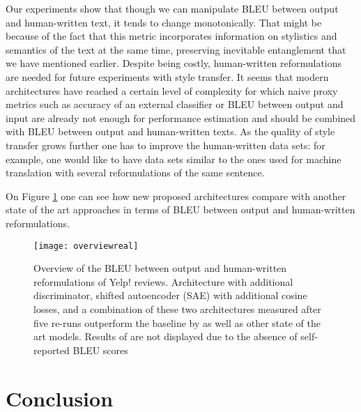 \documentclass[11pt,a4paper]{article}
\begin{document}
Our experiments show that though we can manipulate BLEU between output and human-written text, it tends to change monotonically. That might be because of the fact that this metric incorporates information on stylistics and semantics of the text at the same time, preserving inevitable entanglement that we have mentioned earlier. Despite being costly, human-written reformulations are needed for future experiments with style transfer. It seems that modern architectures have reached a certain level of complexity for which naive proxy metrics such as accuracy of an external classifier or BLEU between output and input are already not enough for performance estimation and should be combined with BLEU between output and human-written texts. As the quality of style transfer grows further one has to improve the human-written data sets: for example, one would like to have data sets similar to the ones used for machine translation with several reformulations of the same sentence. 

On Figure \ref{pic:ovreal} one can see how new proposed architectures compare with another state of the art approaches in terms of BLEU between output and human-written reformulations.

\begin{figure}[ht]
\begin{center}
\centerline{\texttt{[image: overviewreal]}}
\caption{Overview of the BLEU between output and human-written reformulations of Yelp! reviews. Architecture with additional discriminator, shifted autoencoder (SAE) with additional cosine losses, and a combination of these two architectures measured after five re-runs outperform the baseline by \cite{hylsx} as well as other state of the art models. Results of \cite{romanov18} are not displayed due to the absence of self-reported BLEU scores}
\label{pic:ovreal}
\end{center}
\end{figure}


\section{Conclusion}
\end{document}
